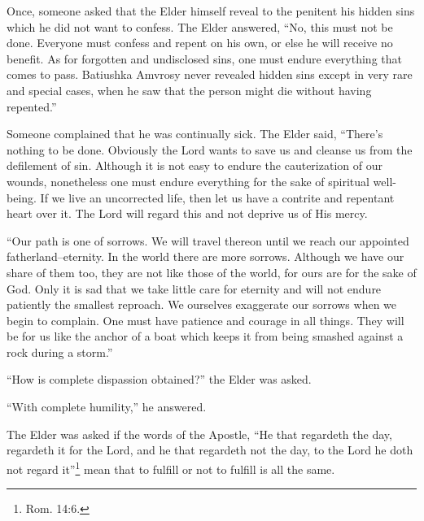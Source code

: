 Once, someone asked that the Elder himself reveal to the penitent his hidden sins which he did not want to confess. The Elder answered, “No, this must not be done. Everyone must confess and repent on his own, or else he will receive no benefit. As for forgotten and undisclosed sins, one must endure everything that comes to pass. Batiushka Amvrosy never revealed hidden sins except in very rare and special cases, when he saw that the person might die without having repented.”

Someone complained that he was continually sick. The Elder said, “There's nothing to be done. Obviously the Lord wants to save us and cleanse us from the defilement of sin. Although it is not easy to endure the cauterization of our wounds, nonetheless one must endure everything for the sake of spiritual well-being. If we live an uncorrected life, then let us have a contrite and repentant heart over it. The Lord will regard this and not deprive us of His mercy.

“Our path is one of sorrows. We will travel thereon until we reach our appointed fatherland--eternity. In the world there are more sorrows. Although we have our share of them too, they are not like those of the world, for ours are for the sake of God. Only it is sad that we take little care for eternity and will not endure patiently the smallest reproach. We ourselves exaggerate our sorrows when we begin to complain. One must have patience and courage in all things. They will be for us like the anchor of a boat which keeps it from being smashed against a rock during a storm.”

“How is complete dispassion obtained?” the Elder was asked.

“With complete humility,” he answered.

The Elder was asked if the words of the Apostle, “He that regardeth the day, regardeth it for the Lord, and he that regardeth not the day, to the Lord he doth not regard it”\footnote{Rom. 14:6.} mean that to fulfill or not to fulfill is all the same.

